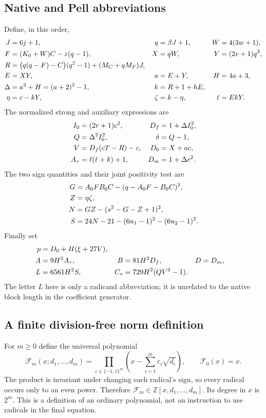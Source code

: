 \documentclass[11pt]{article}
\theoremstyle{remark}\newtheorem{remark}[theorem]{Remark}
\newcommand{\Z}{\mathbb Z}\newcommand{\Q}{\mathbb Q}\newcommand{\N}{\mathbb N}
\begin{document}
\subsection{Native and Pell abbreviations}
Define, in this order,
\begin{align}
 J&=6j+1,& q&=\beta J+1,& W&=4(3w+1),\notag\\
 F&=(K_0+W)C-z(q-1),& X&=qW,&Y&=(2v+1)q^3,\notag\\
 R&=\bigl(q(q-F)-C\bigr)(q^2-1)+(M_C+qM_F)J,\label{eq:prefix}\\
 E&=XY,&a&=E+Y,&H&=4a+3,\notag\\
 \Delta&=a^2+H=(a+2)^2-1,&k&=R+1+hE,\notag\\
 \eta&=c-kY,&\zeta&=k-\eta,&\ell&=EkY.\notag
\end{align}
The normalized strong and auxiliary expressions are
\begin{align}
 I_0&=(2r+1)c^2,& D_f&=1+\Delta I_0^2,\notag\\
 Q&=\Delta^2I_0^2,&\delta&=Q-1,\notag\\
 V&=D_f(cT-R)-c,&D_0&=X+ac,\label{eq:pell}\\
 A_\tau&=\ell(\ell+k)+1,&D_m&=1+\Delta c^2.\notag
\end{align}
The two sign quantities and their joint positivity test are
\begin{align}
 G&=A_0FB_0C-(q-A_0F-B_0C)^2,\notag\\
 Z&=\eta\zeta,\notag\\
 N&=GZ-(s^2-G-Z+1)^2,\label{eq:guard}\\
 S&=24N-21-(6u_1-1)^2-(6u_2-1)^2.\notag
\end{align}
Finally set
\begin{align}
 p&=D_0+H(\xi+27V),\notag\\
 A&=9H^2A_\tau,& B&=81H^2D_f,& D&=D_m,\label{eq:normports}\\
 L&=6561H^2S,& C_*&=729H^2(QV^2-1).\notag
\end{align}
The letter $L$ here is only a radicand abbreviation; it is unrelated to the
native block length in the coefficient generator.

\subsection{A finite division-free norm definition}
For $m\ge0$ define the universal polynomial
\begin{equation}\label{eq:universalnorm}
 \mathcal F_m(x;d_1,\ldots,d_m)=
 \prod_{\varepsilon\in\{-1,1\}^m}
 \left(x-\sum_{i=1}^m\varepsilon_i\sqrt{d_i}\right),
 \qquad\mathcal F_0(x)=x.
\end{equation}
The product is invariant under changing each radical's sign, so every
radical occurs only to an even power. Therefore
$\mathcal F_m\in\Z[x,d_1,\ldots,d_m]$. Its degree in $x$ is $2^m$.
This is a definition of an ordinary polynomial, not an instruction to use
radicals in the final equation.
\end{document}
